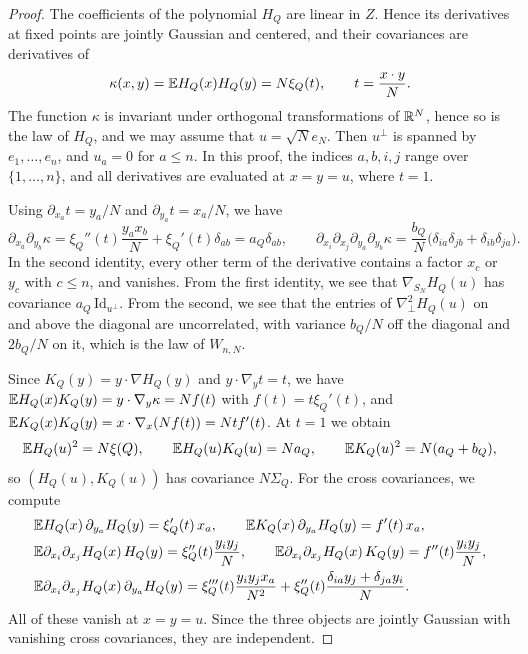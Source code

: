 \begin{proof}
The coefficients of the polynomial $H_Q$ are linear in $Z$. Hence its derivatives at fixed points are jointly Gaussian and centered, and their covariances are derivatives of
\[
\kappa(x,y)=\mathbb E H_Q(x)H_Q(y)=N\xi_Q(t),\qquad t=\frac{x\cdot y}N.
\]
The function $\kappa$ is invariant under orthogonal transformations of $\mathbb R^N$, hence so is the law of $H_Q$, and we may assume that $u=\sqrt N e_N$. Then $u^\perp$ is spanned by $e_1,\dots,e_n$, and $u_a=0$ for $a\le n$. In this proof, the indices $a,b,i,j$ range over $\{1,\dots,n\}$, and all derivatives are evaluated at $x=y=u$, where $t=1$.

Using $\partial_{x_a}t=y_a/N$ and $\partial_{y_a}t=x_a/N$, we have
\[
\partial_{x_a}\partial_{y_b}\kappa=\xi_Q''(t)\frac{y_ax_b}N+\xi_Q'(t)\delta_{ab}=a_Q\delta_{ab},\qquad
\partial_{x_i}\partial_{x_j}\partial_{y_a}\partial_{y_b}\kappa=\frac{b_Q}N\big(\delta_{ia}\delta_{jb}+\delta_{ib}\delta_{ja}\big).
\]
In the second identity, every other term of the derivative contains a factor $x_c$ or $y_c$ with $c\le n$, and vanishes. From the first identity, we see that $\nabla_{S_N}H_Q(u)$ has covariance $a_Q\,\mathrm{Id}_{u^\perp}$. From the second, we see that the entries of $\nabla^2_\perp H_Q(u)$ on and above the diagonal are uncorrelated, with variance $b_Q/N$ off the diagonal and $2b_Q/N$ on it, which is the law of $W_{n,N}$.

Since $K_Q(y)=y\cdot\nabla H_Q(y)$ and $y\cdot\nabla_yt=t$, we have $\mathbb E H_Q(x)K_Q(y)=y\cdot\nabla_y\kappa=Nf(t)$ with $f(t)=t\xi_Q'(t)$, and $\mathbb E K_Q(x)K_Q(y)=x\cdot\nabla_x(Nf(t))=Ntf'(t)$. At $t=1$ we obtain
\[
\mathbb E H_Q(u)^2=N\xi(Q),\qquad \mathbb E H_Q(u)K_Q(u)=Na_Q,\qquad \mathbb E K_Q(u)^2=N(a_Q+b_Q),
\]
so $(H_Q(u),K_Q(u))$ has covariance $N\Sigma_Q$. For the cross covariances, we compute
\[
\begin{aligned}
&\mathbb E H_Q(x)\,\partial_{y_a}H_Q(y)=\xi_Q'(t)\,x_a,\qquad \mathbb E K_Q(x)\,\partial_{y_a}H_Q(y)=f'(t)\,x_a,\\
&\mathbb E \partial_{x_i}\partial_{x_j}H_Q(x)\,H_Q(y)=\xi_Q''(t)\frac{y_iy_j}N,\qquad \mathbb E\partial_{x_i}\partial_{x_j}H_Q(x)\,K_Q(y)=f''(t)\frac{y_iy_j}N,\\
&\mathbb E\partial_{x_i}\partial_{x_j}H_Q(x)\,\partial_{y_a}H_Q(y)=\xi_Q'''(t)\frac{y_iy_jx_a}{N^2}+\xi_Q''(t)\frac{\delta_{ia}y_j+\delta_{ja}y_i}N.
\end{aligned}
\]
All of these vanish at $x=y=u$. Since the three objects are jointly Gaussian with vanishing cross covariances, they are independent.


\end{proof}
